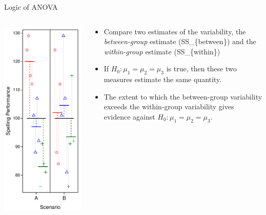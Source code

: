 \documentclass[presentation]{beamer}
\begin{document}
\begin{frame}[label={sec:org6e0477a}]{Logic of ANOVA}
\begin{columns}
\begin{column}{.25\columnwidth}
\includegraphics[scale=.5]{08_glm_img/spelling-05.pdf}
\end{column}

\begin{column}{.75\columnwidth}
\begin{itemize}
\item Compare two estimates of the variability, the \emph{between-group}
estimate (SS\_\{between\}) and the \emph{within-group} estimate (SS\_\{within\})
\item If \(H_0: \mu_1=\mu_2=\mu_3\) is true, then these two measures
estimate the same quantity.
\item The extent to which the between-group variability exceeds the
within-group variability gives evidence against \(H_0: \mu_1=\mu_2=\mu_3\).
\end{itemize}
\end{column}
\end{columns}
\end{frame}
\end{document}
